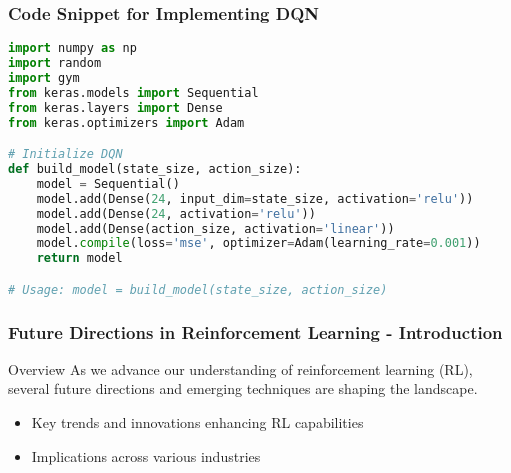 \documentclass[aspectratio=169]{beamer}
\begin{document}
\begin{frame}[fragile]
    \frametitle{Code Snippet for Implementing DQN}
    \begin{lstlisting}[language=Python]
import numpy as np
import random
import gym
from keras.models import Sequential
from keras.layers import Dense
from keras.optimizers import Adam

# Initialize DQN
def build_model(state_size, action_size):
    model = Sequential()
    model.add(Dense(24, input_dim=state_size, activation='relu'))
    model.add(Dense(24, activation='relu'))
    model.add(Dense(action_size, activation='linear'))
    model.compile(loss='mse', optimizer=Adam(learning_rate=0.001))
    return model

# Usage: model = build_model(state_size, action_size)
    \end{lstlisting}
\end{frame}

\begin{frame}[fragile]
    \frametitle{Future Directions in Reinforcement Learning - Introduction}
    \begin{block}{Overview}
        As we advance our understanding of reinforcement learning (RL), several future directions and emerging techniques are shaping the landscape.
    \end{block}
    \begin{itemize}
        \item Key trends and innovations enhancing RL capabilities
        \item Implications across various industries
    \end{itemize}
\end{frame}
\end{document}
